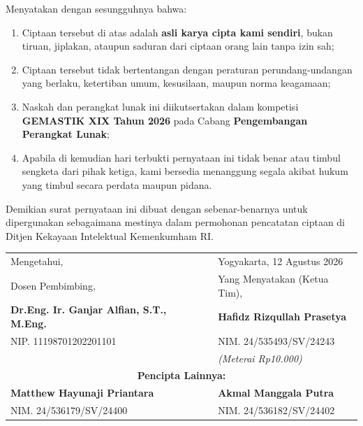 \documentclass[10pt,a4paper]{article}
\begin{document}
\vspace{0.4em}
Menyatakan dengan sesungguhnya bahwa:
\begin{enumerate}
    \setlength{\itemsep}{1pt}
    \setlength{\parskip}{0pt}
    \item Ciptaan tersebut di atas adalah \textbf{asli karya cipta kami sendiri}, bukan tiruan, jiplakan, ataupun saduran dari ciptaan orang lain tanpa izin sah;
    \item Ciptaan tersebut tidak bertentangan dengan peraturan perundang-undangan yang berlaku, ketertiban umum, kesusilaan, maupun norma keagamaan;
    \item Naskah dan perangkat lunak ini diikutsertakan dalam kompetisi \textbf{GEMASTIK XIX Tahun 2026} pada Cabang \textbf{Pengembangan Perangkat Lunak};
    \item Apabila di kemudian hari terbukti pernyataan ini tidak benar atau timbul sengketa dari pihak ketiga, kami bersedia menanggung segala akibat hukum yang timbul secara perdata maupun pidana.
\end{enumerate}

Demikian surat pernyataan ini dibuat dengan sebenar-benarnya untuk dipergunakan sebagaimana mestinya dalam permohonan pencatatan ciptaan di Ditjen Kekayaan Intelektual Kemenkumham RI.

\vspace{1em}

\begin{tabularx}{\textwidth}{@{}X c X@{}}
    Mengetahui, & & Yogyakarta, 12 Agustus 2026 \\[2pt]
    Dosen Pembimbing, & & Yang Menyatakan (Ketua Tim), \\[20pt]
    \textbf{Dr.Eng. Ir. Ganjar Alfian, S.T., M.Eng.} & \phantom{space} & \textbf{Hafidz Rizqullah Prasetya} \\
    NIP. 11198701202201101 & & NIM. 24/535493/SV/24243 \\
    & & \textit{\footnotesize (Meterai Rp10.000)} \\[10pt]
    \multicolumn{3}{c}{\textbf{Pencipta Lainnya:}} \\[6pt]
    \textbf{Matthew Hayunaji Priantara} & & \textbf{Akmal Manggala Putra} \\
    NIM. 24/536179/SV/24400 & & NIM. 24/536182/SV/24402 \\
\end{tabularx}
\end{document}
